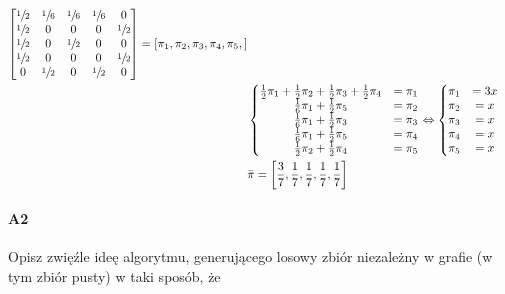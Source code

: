 \begin{enumerate}[label=\alph*)]
\begin{enumerate}
\begin{align*}
\begin{bmatrix}
\sfrac{1}{2} & \sfrac{1}{6} & \sfrac{1}{6} & \sfrac{1}{6} & 0 \\
\sfrac{1}{2} & 0 & 0 & 0 & \sfrac{1}{2} \\
\sfrac{1}{2} & 0 & \sfrac{1}{2} & 0 & 0  \\
\sfrac{1}{2} & 0 & 0 & 0 & \sfrac{1}{2} \\
0 & \sfrac{1}{2} & 0 & \sfrac{1}{2} & 0 
\end{bmatrix}=\left[\pi _1,\pi _2,\pi _3,\pi _4,\pi _5,\right]\\
&\left\{\begin{matrix}
\frac{1}{2}\pi _1 + \frac{1}{2}\pi _2+ \frac{1}{2}\pi _3+ \frac{1}{2}\pi _4 &= \pi _1\\
\frac{1}{6}\pi _1 + \frac{1}{2}\pi _5 &= \pi _2\\
\frac{1}{6}\pi _1 + \frac{1}{2}\pi _3 &= \pi _3\\
\frac{1}{6}\pi _1 + \frac{1}{2}\pi _5 &= \pi_4 \\
\frac{1}{2}\pi _2+\frac{1}{2}\pi _4 &= \pi _5
\end{matrix}\right. \Leftrightarrow \left\{\begin{matrix}
\pi _1 &= 3x\\
\pi _2 &= x\\
\pi _3 &= x\\
\pi _4 &= x\\
\pi _5 &= x
\end{matrix}\right.\\
&\bar{\pi}=\left[\frac{3}{7},\frac{1}{7},\frac{1}{7},\frac{1}{7},\frac{1}{7}\right]
\end{align*}
\end{enumerate}
\end{enumerate}



\paragraph{A2} Opisz zwięźle ideę algorytmu, generującego losowy zbiór niezależny w grafie (w tym zbiór pusty) w taki sposób, że \label{par:10-A2}

